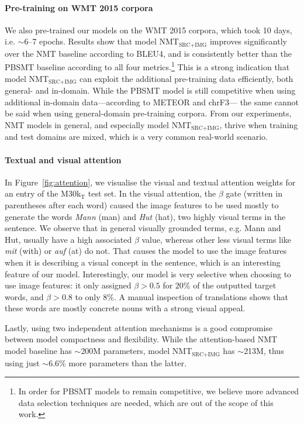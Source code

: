 \documentclass[11pt]{article}
\begin{document}
\paragraph{Pre-training on WMT 2015 corpora}

We also pre-trained our models on the WMT 2015 corpora, which took 10 days, i.e. $\sim$6--7 epochs.
Results show that model NMT$_{\text{SRC+IMG}}$ improves significantly over the NMT baseline according to BLEU4, and is consistently better than the PBSMT baseline according to all four metrics.\footnote{In order for PBSMT models to remain competitive, we believe more advanced data selection techniques are needed, which are out of the scope of this work.}
This is a strong indication that model NMT$_{\text{SRC+IMG}}$ can exploit the additional pre-training data efficiently, both general- and in-domain.
While the PBSMT model is still competitive when using additional in-domain data---according to METEOR and chrF3--- the same cannot be said when using general-domain pre-training corpora.
From our experiments, NMT models in general, and especially model NMT$_{\text{SRC+IMG}}$, thrive when training and test domains are mixed, which is a very common real-world scenario.


\paragraph{Textual and visual attention}

In Figure~\ref{fig:attention}, we visualise the visual and textual attention weights for an entry of the M30k$_\text{T}$ test set.
In the visual attention, the $\beta$ gate (written in parentheses after each word) caused the image features to be used mostly to generate the words \emph{Mann} (man) and \emph{Hut} (hat), two highly visual terms in the sentence.
We observe that in general visually grounded terms, e.g. Mann and Hut, usually have a high associated $\beta$ value, whereas other less visual terms like \emph{mit} (with) or \emph{auf} (at) do not.
That causes the model to use the image features when it is describing a visual concept in the sentence, which is an interesting feature of our model.
Interestingly, our model is very selective when choosing to use image features: it only assigned $\beta>0.5$ for $20\%$ of the outputted target words, and $\beta>0.8$ to only $8\%$.
A manual inspection of translations shows that these words are mostly concrete nouns with a strong visual appeal.

Lastly, using two independent attention mechanisms is a good compromise between model compactness and flexibility.
While the attention-based NMT model baseline has $\sim$200M parameters,
model NMT$_{\text{SRC+IMG}}$ has $\sim$213M,
thus using just $\sim$6.6\% more parameters than the latter.
\end{document}
